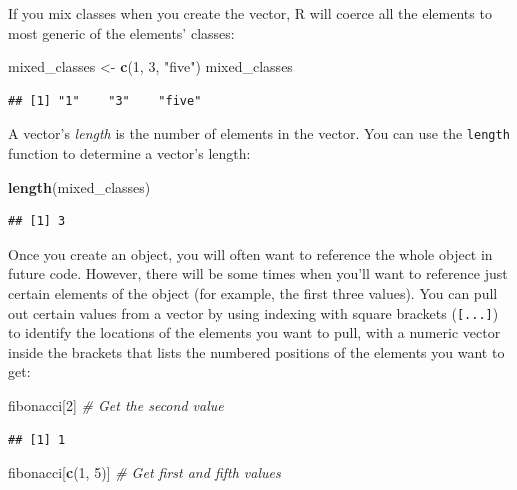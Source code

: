 \documentclass[]{book}
\makeatletter
\newenvironment{Shaded}{\begin{snugshade}}{\end{snugshade}}
\newcommand{\KeywordTok}[1]{\textcolor[rgb]{0.13,0.29,0.53}{\textbf{#1}}}
\newcommand{\DecValTok}[1]{\textcolor[rgb]{0.00,0.00,0.81}{#1}}
\newcommand{\StringTok}[1]{\textcolor[rgb]{0.31,0.60,0.02}{#1}}
\newcommand{\CommentTok}[1]{\textcolor[rgb]{0.56,0.35,0.01}{\textit{#1}}}
\newcommand{\NormalTok}[1]{#1}
\newenvironment{kframe}{%
\medskip{}
\setlength{\fboxsep}{.8em}
 \def\at@end@of@kframe{}%
 \ifinner\ifhmode%
  \def\at@end@of@kframe{\end{minipage}}%
  \begin{minipage}{\columnwidth}%
 \fi\fi%
 \def\FrameCommand##1{\hskip\@totalleftmargin \hskip-\fboxsep
 \colorbox{shadecolor}{##1}\hskip-\fboxsep
     \hskip-\linewidth \hskip-\@totalleftmargin \hskip\columnwidth}%
 \MakeFramed {\advance\hsize-\width
   \@totalleftmargin\z@ \linewidth\hsize
   \@setminipage}}%
 {\par\unskip\endMakeFramed%
 \at@end@of@kframe}
\renewenvironment{Shaded}{\begin{kframe}}{\end{kframe}}
\theoremstyle{definition}
\theoremstyle{definition}
\theoremstyle{definition}
\theoremstyle{remark}
\makeatother
\begin{document}
If you mix classes when you create the vector, R will coerce all the
elements to most generic of the elements' classes:

\begin{Shaded}
\begin{Highlighting}[]
\NormalTok{mixed_classes <-}\StringTok{ }\KeywordTok{c}\NormalTok{(}\DecValTok{1}\NormalTok{, }\DecValTok{3}\NormalTok{, }\StringTok{"five"}\NormalTok{)}
\NormalTok{mixed_classes}
\end{Highlighting}
\end{Shaded}

\begin{verbatim}
## [1] "1"    "3"    "five"
\end{verbatim}

A vector's \emph{length} is the number of elements in the vector. You
can use the \texttt{length} function to determine a vector's length:

\begin{Shaded}
\begin{Highlighting}[]
\KeywordTok{length}\NormalTok{(mixed_classes)}
\end{Highlighting}
\end{Shaded}

\begin{verbatim}
## [1] 3
\end{verbatim}

Once you create an object, you will often want to reference the whole
object in future code. However, there will be some times when you'll
want to reference just certain elements of the object (for example, the
first three values). You can pull out certain values from a vector by
using indexing with square brackets (\texttt{{[}...{]}}) to identify the
locations of the elements you want to pull, with a numeric vector inside
the brackets that lists the numbered positions of the elements you want
to get:

\begin{Shaded}
\begin{Highlighting}[]
\NormalTok{fibonacci[}\DecValTok{2}\NormalTok{] }\CommentTok{# Get the second value}
\end{Highlighting}
\end{Shaded}

\begin{verbatim}
## [1] 1
\end{verbatim}

\begin{Shaded}
\begin{Highlighting}[]
\NormalTok{fibonacci[}\KeywordTok{c}\NormalTok{(}\DecValTok{1}\NormalTok{, }\DecValTok{5}\NormalTok{)] }\CommentTok{# Get first and fifth values}
\end{Highlighting}
\end{Shaded}
\end{document}
